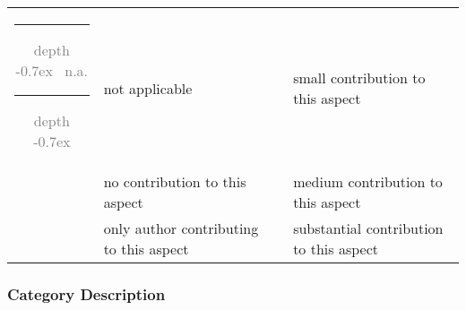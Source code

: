 \documentclass{article}
\newcommand*\low{\begin{tikzpicture}
\draw[fill=white, draw=gray] (0,0) circle (1mm);
\end{tikzpicture}}
\newcommand*\medium{\begin{tikzpicture}
\draw[fill=gray!25, draw=gray] (0,0) circle (1.3mm);
\end{tikzpicture}}
\newcommand*\high{\begin{tikzpicture}
\draw[fill=gray!85, draw=gray!85] (0,0) circle (1.6mm);
\end{tikzpicture}}
\newcommand*\sole{\begin{tikzpicture}
\draw[fill=black, draw=black] (0,0) circle (1.9mm);
\end{tikzpicture}}
\newcommand*\none{\begin{tikzpicture}
\node[] at (0,0) {\textcolor{gray}{x}};
\end{tikzpicture}}
\newcommand*\na[1]{\multicolumn{#1}{c}{\textcolor{gray}{\leavevmode\leaders\hrule height 0.7ex depth \dimexpr0.4pt-0.7ex\hfill\kern0pt ~n.a. \leavevmode\leaders\hrule height 0.7ex depth \dimexpr0.4pt-0.7ex\hfill\kern0pt }}}
\begin{document}

\begin{table}[h]
\centering
\begin{tabular}{clcl}
 \na{1}        & not applicable  &
 \low       & small contribution to this aspect\\
 \none      & no contribution to this aspect &
 \medium    & medium contribution to this aspect\\
 \sole      & only author contributing to this aspect&
 \high      & substantial contribution to this aspect\\
\end{tabular}
\end{table}

\clearpage
\subsubsection*{Category Description}
\end{document}
